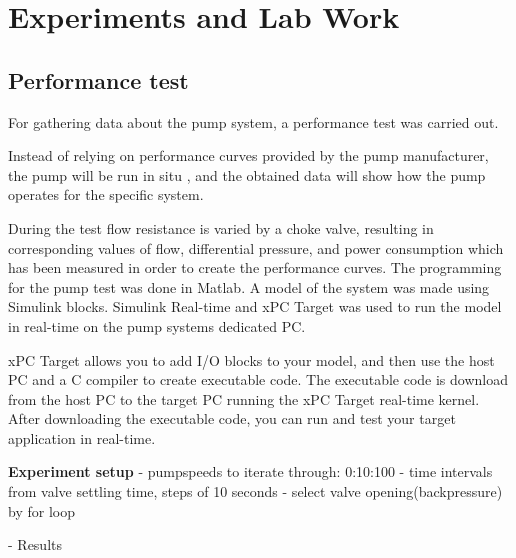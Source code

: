 \chapter{Experiments and Lab Work}\label{ch:experiment} 
\section{Performance test}\label{sec:performance_test} 
For gathering data about the pump system, a performance test was carried out.

Instead of relying on performance curves provided by the pump manufacturer,
the pump will be run in situ , and the obtained data will show how the pump 
operates for the specific system.
 
During the test flow resistance is varied by a choke valve, resulting in 
corresponding values of flow, differential pressure, and power consumption 
which has been measured in order to create the performance curves.
\newline
\newline
The programming for the pump test was done in Matlab. 
A model of the system was made using Simulink blocks. 
Simulink Real-time and xPC Target was used to run the model in real-time 
on the pump systems dedicated PC. 


xPC Target allows you to add I/O blocks to your model, and then use the host 
PC and a C compiler to create executable code. The executable code is download 
from the host PC to the target PC running the xPC Target real-time kernel. 
After downloading the executable code, you can run and test your target 
application in real-time. 


\textbf{Experiment setup}
- pumpspeeds to iterate through: 0:10:100\n
- time intervals from valve settling time, steps of 10 seconds
- select valve opening(backpressure) by for loop


- Results
 